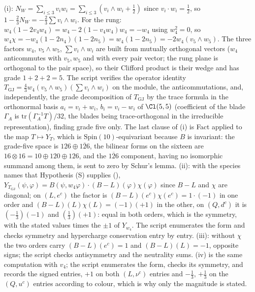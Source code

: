 (i): $N_{W} = \sum_{i\le3} v_{i}w_{i} = \sum_{i\le3}(v_{i}\wedge w_{i} + \tfrac12)$ since $v_{i}\cdot w_{i} = \tfrac12$, so $1 - \tfrac23 N_{W} = -\tfrac23\sum v_{i}\wedge w_{i}$. For the rung: $w_{4}(1 - 2v_{4}w_{4}) = w_{4} - 2(1 - v_{4}w_{4})w_{4} = -w_{4}$ using $w_{4}^{2} = 0$, so $w_{4}\chi = -w_{4}(1 - 2n_{4})(1 - 2n_{5}) = w_{4}(1 - 2n_{5}) = -2w_{4}(v_{5}\wedge w_{5})$. The three factors $w_{4}$, $v_{5}\wedge w_{5}$, $\sum v_{i}\wedge w_{i}$ are built from mutually orthogonal vectors ($w_{4}$ anticommutes with $v_{5}, w_{5}$ and with every pair vector; the rung plane is orthogonal to the pair space), so their Clifford product is their wedge and has grade $1 + 2 + 2 = 5$. The script verifies the operator identity $T_{\mathrm{GJ}} = \tfrac43 w_{4}(v_{5}\wedge w_{5})(\sum v_{i}\wedge w_{i})$ on the module, the anticommutations, and, independently, the grade decomposition of $T_{\mathrm{GJ}}$ by the trace formula in the orthonormal basis $a_{i} = v_{i} + w_{i}$, $b_{i} = v_{i} - w_{i}$ of $\Cl(5,5)$ (coefficient of the blade $\Gamma_{A}$ is $\mathrm{tr}(\Gamma_{A}^{-1}T)/32$, the blades being trace-orthogonal in the irreducible representation), finding grade five only. The last clause of (i) is Fact  applied to the map $T \mapsto Y_{T}$, which is $\mathrm{Spin}(10)$-equivariant because $B$ is invariant: the grade-five space is $126 \oplus \overline{126}$, the bilinear forms on the sixteen are $16 \otimes 16 = 10 \oplus 120 \oplus 126$, and the $\overline{126}$ component, having no isomorphic summand among them, is sent to zero by Schur's lemma. (ii): with the species names that Hypothesis (S) supplies (), $Y_{T_{\mathrm{GJ}}}(\psi, \varphi) = B(\psi, w_{4}\varphi)\cdot(B - L)(\varphi)\chi(\varphi)$ since $B - L$ and $\chi$ are diagonal; on $(L, e^{c})$ the factor is $(B-L)(e^{c})\chi(e^{c}) = 1\cdot(-1)$ in one order and $(B-L)(L)\chi(L) = (-1)(+1)$ in the other, on $(Q, d^{c})$ it is $(-\tfrac13)(-1)$ and $(\tfrac13)(+1)$: equal in both orders, which is the symmetry, with the stated values times the $\pm1$ of $Y_{w_{4}}$. The script enumerates the form and checks symmetry and hypercharge conservation entry by entry. (iii): without $\chi$ the two orders carry $(B-L)(e^{c}) = 1$ and $(B-L)(L) = -1$, opposite signs; the script checks antisymmetry and the neutrality sums. (iv) is the same computation with $v_{4}$; the script enumerates the form, checks its symmetry, and records the signed entries, $+1$ on both $(L, \nu^{c})$ entries and $-\tfrac13$, $+\tfrac13$ on the $(Q, u^{c})$ entries according to colour, which is why only the magnitude is stated.
